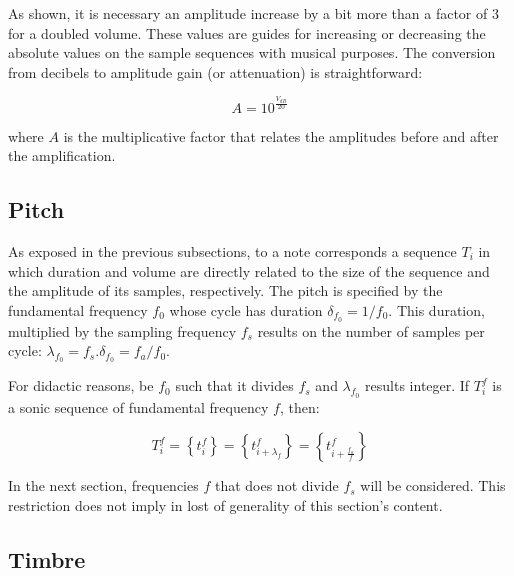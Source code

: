 \documentclass[
 aip,
 jmp,
 amsmath,amssymb,
 reprint,
]{revtex4-1}
\begin{document}
As shown, it is necessary an amplitude increase by a bit more than a factor of 3 for a doubled volume. These values are guides for increasing or decreasing the absolute values on the sample sequences with musical purposes. The conversion from decibels to amplitude gain (or attenuation) is straightforward:

\begin{equation}\label{ampDec}
A = 10^{\frac{V_{dB}}{20}}
\end{equation}

where $A$ is the multiplicative factor that relates the amplitudes before and after the amplification.

\subsection{Pitch}

As exposed in the previous subsections, to a note corresponds a sequence $T_i$ in which duration and volume are directly related to the size of the sequence and the amplitude of its samples, respectively. The pitch is specified by the fundamental frequency $f_0$ whose cycle has duration $\delta_{f_0}=1/f_0$. This duration, multiplied by the sampling frequency $f_s$ results on the number of samples per cycle: $\lambda_{f_0}=f_s . \delta_{f_0} =f_a/f_0$.

For didactic reasons, be $f_0$ such that it divides $f_s$ and $\lambda_{f_0}$ results integer. If $T_i^f$ is a sonic sequence of fundamental frequency $f$, then:

\begin{equation}\label{periodicidade}
     T^f_i=\left\{ t_i^f \right\}=\left\{ t^f_{i+\lambda_{f}}  \right\}= \left\{ t^f_{i+\frac{f_a}{f}} \right\}
\end{equation}

In the next section, frequencies $f$ that does not divide $f_s$ will be considered. This restriction does not imply in lost of generality of this section's content.

\subsection{Timbre}
\end{document}
